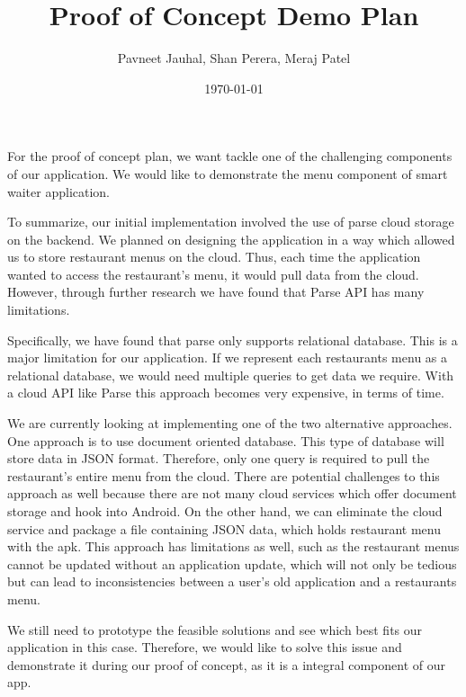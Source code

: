 \documentclass[12pt]{article}
\begin{document}
\title{Proof of Concept Demo Plan} 
\author{Pavneet Jauhal, Shan Perera, Meraj Patel}
\date{\today}

\maketitle

For the proof of concept plan, we want tackle one of the challenging components of our application. We would like to demonstrate the menu component of smart waiter application. 

To summarize, our initial implementation involved the use of parse cloud storage on the backend. We planned on designing the application in a way which allowed us to store restaurant menus on the cloud. Thus, each time the application wanted to access the restaurant’s menu, it would pull data from the cloud. However, through further research we have found that Parse API has many limitations. 

Specifically, we have found that parse only supports relational database. This is a major limitation for our application. If we represent each restaurants menu as a relational database, we would need multiple queries to get data we require.  With a cloud API like Parse this approach becomes very expensive, in terms of time. 

We are currently looking at implementing one of the two alternative approaches. One approach is to use document oriented database. This type of database will store data in JSON format. Therefore, only one query is required to pull the restaurant’s entire menu from the cloud. There are potential challenges to this approach as well because there are not many cloud services which offer document storage and hook into Android.  On the other hand, we can eliminate the cloud service and package a file containing JSON data, which holds restaurant menu with the apk. This approach has limitations as well, such as the restaurant menus cannot be updated without an application update, which will not only be tedious but can lead to inconsistencies between a user's old application and a restaurants menu. 

We still need to prototype the feasible solutions and see which best fits our application in this case. Therefore, we would like to solve this issue and demonstrate it during our proof of concept, as it is a integral component of our app.
\end{document}
